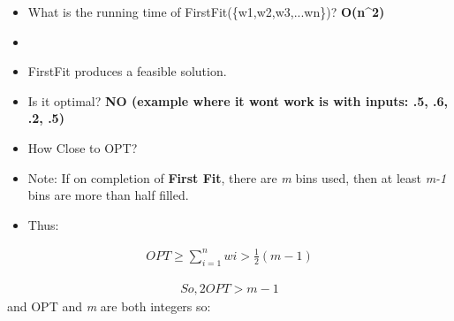 \documentclass{article}
\begin{document}
\noindent{}
\begin{itemize}
\item What is the running time of FirstFit(\{w1,w2,w3,...wn\})? \textbf{O(n^2)}
\item  
\item FirstFit produces a feasible solution.  
\item \tab Is it optimal? \textbf{ NO (example where it wont work is with inputs: .5, .6, .2, .5)} 
\item How Close to OPT? 
\item Note: If on completion of \textbf{First Fit}, there are \textit{m} bins used, then at least \textit{m-1} bins are more than half filled.
\item Thus:
\end{itemize}
\begin{equation} \label{eq1}
\begin{split}
OPT \geq \sum_{i=1}^{n} wi > \frac{1}{2}(m-1) 
\end{split}
\end{equation}

\begin{equation} 
\begin{split}
So, 2OPT > m-1
\end{split}
\end{equation}
and OPT and \textit{m} are both integers so: \\
\noindent{}
\end{document}
